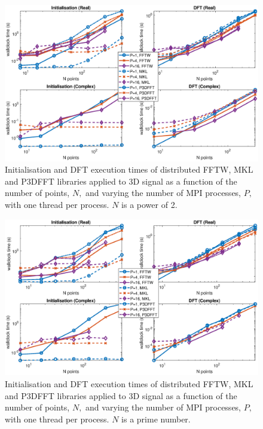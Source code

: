\documentclass[a4paper]{article}
\begin{document}
\begin{figure}[htb]
    \centering
    \includegraphics[width=0.9\linewidth]{../results/fftw_mkl_p3dfft_2_3d_mpi.eps}
  \caption{Initialisation and DFT execution times of distributed FFTW, MKL and P3DFFT libraries applied to 3D signal as a function of the
    number of points, $N,$ and varying the number of MPI processes, $P,$ with one thread per process. $N$ is a power of 2.}
  \label{3DDistFFTWMKLP3DFFT2}
\end{figure}


\begin{figure}[htb]
    \centering
    \includegraphics[width=0.9\linewidth]{../results/fftw_mkl_p3dfft_prime_3d_mpi.eps}
  \caption{Initialisation and DFT execution times of distributed FFTW, MKL and P3DFFT libraries applied to 3D signal as a function of the
    number of points, $N,$ and varying the number of MPI processes, $P,$ with one thread per process. $N$ is a prime number.}
  \label{3DDistFFTWMKLP3DFFTprime}
\end{figure}
\end{document}
